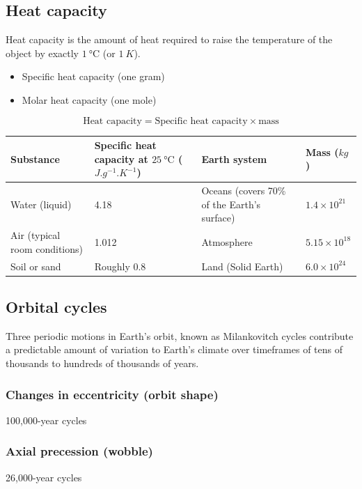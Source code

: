\documentclass[11pt]{article}
\begin{document}
\subsection{Heat capacity}
\label{sec:orga1efc19}
Heat capacity is the amount of heat required to raise the temperature of the object by exactly \(\qty{1}{\degreeCelsius}\) (or \(\qty{1}{K}\)).

\begin{itemize}
\item Specific heat capacity (one gram)
\item Molar heat capacity (one mole)
\end{itemize}

\[\text{Heat capacity} = \text{Specific heat capacity} \times \text{mass}\]

\begin{center}
\begin{tabular}{|m{8em}|m{10em}|m{10em}|m{5em}|}
\hline
Substance & Specific heat capacity at \(\qty{25}{\degreeCelsius}\) (\(\unit{J.g^{-1}.K^{-1}}\)) & Earth system & Mass (\(\unit{kg}\))\\
\hline
Water (liquid) & 4.18 & Oceans (covers 70\% of the Earth's surface) & \(1.4 \times 10^{21}\)\\
\hline
Air (typical room conditions) & 1.012 & Atmosphere & \(5.15 \times 10^{18}\)\\
\hline
Soil or sand & Roughly 0.8 & Land (Solid Earth) & \(6.0 \times 10^{24}\)\\
\hline
\end{tabular}
\end{center}

\newpage
\subsection{Orbital cycles}
\label{sec:orgad6d368}
Three periodic motions in Earth's orbit, known as Milankovitch cycles contribute a predictable amount of variation to Earth's climate over timeframes of tens of thousands to hundreds of thousands of years.
\subsubsection{Changes in eccentricity (orbit shape)}
\label{sec:org0d839af}
100,000-year cycles
\subsubsection{Axial precession (wobble)}
\label{sec:org48627cd}
26,000-year cycles
\end{document}
